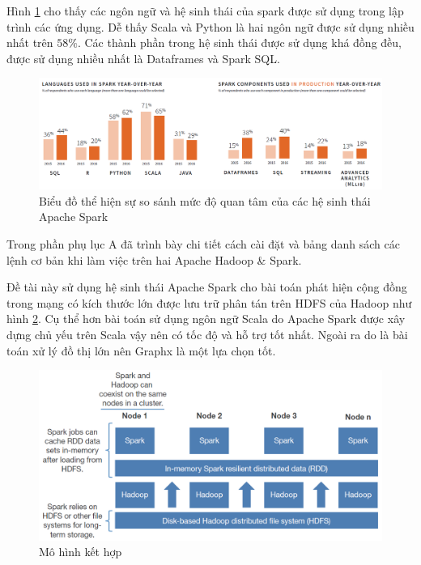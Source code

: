 Hình \ref{fig:databricks_2016_spark_survey1} cho thấy các ngôn ngữ và hệ sinh thái của spark được sử dụng trong lập trình các ứng dụng. Dễ thấy Scala và Python là hai ngôn ngữ được sử dụng nhiều nhất trên $58\%$. Các thành phần trong hệ sinh thái được sử dụng khá đồng đều, được sử dụng nhiều nhất là Dataframes và Spark SQL.
\begin{figure}[H]
	\centering
	\includegraphics[width=\linewidth]{Chapter4/Chapter4Figs/databricks_2016_spark_survey1.PNG}
	\caption{Biểu đồ thể hiện sự so sánh mức độ quan tâm của các hệ sinh thái Apache Spark}
	\label{fig:databricks_2016_spark_survey1}
\end{figure}

Trong phần phụ lục A đã trình bày chi tiết cách cài đặt và bảng danh sách các lệnh cơ bản khi làm việc trên hai Apache Hadoop \& Spark.

Đề tài này sử dụng hệ sinh thái Apache Spark cho bài toán phát hiện cộng đồng trong mạng có kích thước lớn được lưu trữ phân tán trên HDFS của Hadoop như hình \ref{fig:forrester_spark}. Cụ thể hơn bài toán sử dụng ngôn ngữ Scala do Apache Spark được xây dựng chủ yếu trên Scala vậy nên có tốc độ và hỗ trợ tốt nhất. Ngoài ra do là bài toán xử lý đồ thị lớn nên Graphx là một lựa chọn tốt.
\begin{figure}[H]
	\centering
	\includegraphics[width=\linewidth]{Chapter4/Chapter4Figs/forrester_spark.PNG}
	\caption{Mô hình kết hợp }
	\label{fig:forrester_spark}
\end{figure}
